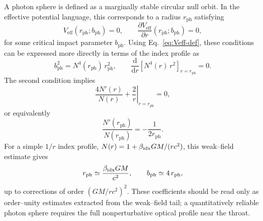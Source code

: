 \documentclass[11pt]{article}
\begin{document}
A photon sphere is defined as a marginally stable circular null orbit.
In the effective potential language, this corresponds to a radius \(r_{\text{ph}}\)
satisfying
\begin{equation}
  V_{\text{eff}}(r_{\text{ph}}; b_{\text{ph}}) = 0,
  \qquad
  \frac{\partial V_{\text{eff}}}{\partial r}
    (r_{\text{ph}}; b_{\text{ph}}) = 0,
  \label{eq:photon-sphere-conditions}
\end{equation}
for some critical impact parameter \(b_{\text{ph}}\).  Using
Eq.~\eqref{eq:Veff-def}, these conditions can be expressed more directly in
terms of the index profile as
\begin{equation}
  b_{\text{ph}}^2
  = N^4(r_{\text{ph}})\,r_{\text{ph}}^2,
  \qquad
  \frac{\mathrm{d}}{\mathrm{d}r}
  \left[ N^4(r)\,r^2 \right]_{r = r_{\text{ph}}}
  = 0.
  \label{eq:photon-sphere-N}
\end{equation}
The second condition implies
\begin{equation}
  \left. \frac{4 N'(r)}{N(r)}
    + \frac{2}{r}
  \right|_{r = r_{\text{ph}}}
  = 0,
\end{equation}
or equivalently
\begin{equation}
  \frac{N'(r_{\text{ph}})}{N(r_{\text{ph}})}
  = -\frac{1}{2 r_{\text{ph}}}.
  \label{eq:photon-sphere-slope}
\end{equation}
For a simple \(1/r\) index profile,
\(N(r) = 1 + \beta_{\rm idx} G M/(r c^2)\), this weak--field estimate gives
\begin{equation}
  r_{\text{ph}}
  \simeq \frac{\beta_{\rm idx} G M}{c^2},
  \qquad
  b_{\text{ph}}
  \simeq 4\,r_{\text{ph}},
  \label{eq:rph-beta}
\end{equation}
up to corrections of order \((G M / r c^2)^2\).  These coefficients should
be read only as order--unity estimates extracted from the weak--field tail;
a quantitatively reliable photon sphere requires the full nonperturbative
optical profile near the throat.
\end{document}
